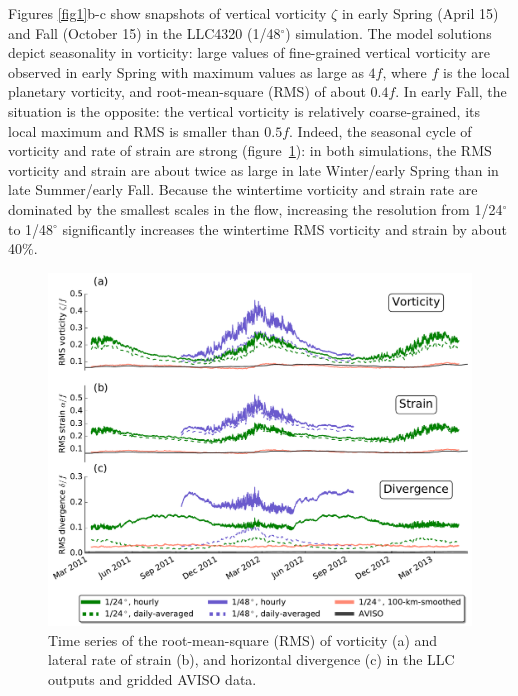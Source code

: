 \documentclass[grl]{agutex2015}
\begin{document}
\begin{article}
Figures \ref{fig1}b-c show snapshots of vertical vorticity $\zeta$ in early Spring
(April 15) and Fall (October 15) in the LLC4320 (1/48$^\circ$) simulation.
The model solutions depict seasonality in vorticity: large values of
fine-grained vertical vorticity are observed in early Spring with maximum
values as large as $4f$, where $f$ is
the local planetary vorticity, and root-mean-square (RMS) of about $0.4f$. In early
Fall, the situation is the opposite: the vertical vorticity is relatively coarse-grained,
its local maximum and RMS is smaller than $0.5f$.
Indeed, the seasonal cycle of vorticity and rate of strain are strong (figure~\ref{fig2}):
in both simulations, the RMS vorticity and strain are about twice as large in
late Winter/early Spring
than in late Summer/early Fall. Because the wintertime vorticity and strain rate
are dominated by the smallest scales in the flow, increasing the resolution from
1/24$^\circ$ to 1/48$^\circ$ significantly increases the wintertime RMS vorticity
and strain by about 40$\%$.


 \begin{figure}[ht]
   \begin{center}
     \includegraphics[width=.65\textwidth]{figs/fig2.pdf}
  \caption{Time series of the root-mean-square (RMS) of vorticity (a) and
  lateral rate of strain (b), and horizontal divergence (c) in the LLC outputs and gridded AVISO data.}
  \label{fig2}
  \end{center}
\end{figure}


\end{article}
\end{document}
